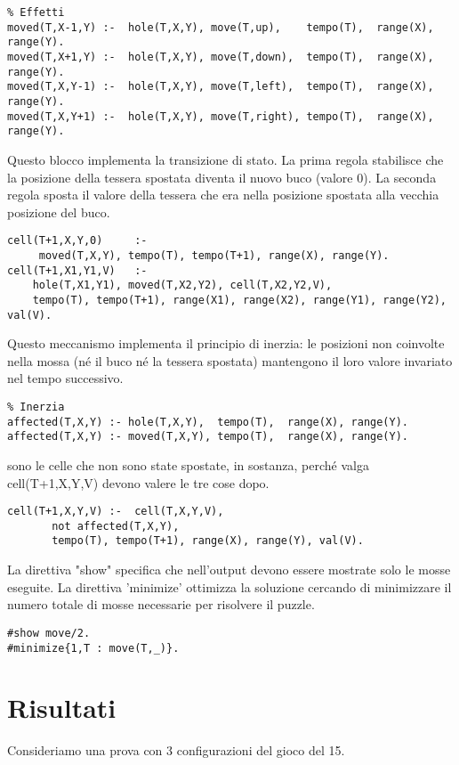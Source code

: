 \begin{verbatim}
% Effetti
moved(T,X-1,Y) :-  hole(T,X,Y), move(T,up),    tempo(T),  range(X), range(Y).
moved(T,X+1,Y) :-  hole(T,X,Y), move(T,down),  tempo(T),  range(X), range(Y).
moved(T,X,Y-1) :-  hole(T,X,Y), move(T,left),  tempo(T),  range(X), range(Y).
moved(T,X,Y+1) :-  hole(T,X,Y), move(T,right), tempo(T),  range(X), range(Y).
\end{verbatim}

Questo blocco implementa la transizione di stato. La prima regola stabilisce che la posizione della tessera spostata diventa il nuovo buco (valore 0). La seconda regola sposta il valore della tessera che era nella posizione spostata alla vecchia posizione del buco.

\begin{verbatim}
cell(T+1,X,Y,0)     :-  
     moved(T,X,Y), tempo(T), tempo(T+1), range(X), range(Y). 
cell(T+1,X1,Y1,V)   :-  
    hole(T,X1,Y1), moved(T,X2,Y2), cell(T,X2,Y2,V), 
    tempo(T), tempo(T+1), range(X1), range(X2), range(Y1), range(Y2), val(V).
\end{verbatim}

Questo meccanismo implementa il principio di inerzia: le posizioni non coinvolte nella mossa (né il buco né la tessera spostata) mantengono il loro valore invariato nel tempo successivo.

\begin{verbatim}
% Inerzia
affected(T,X,Y) :- hole(T,X,Y),  tempo(T),  range(X), range(Y).
affected(T,X,Y) :- moved(T,X,Y), tempo(T),  range(X), range(Y).
\end{verbatim}sono le celle che non sono state spostate, in sostanza, perché valga cell(T+1,X,Y,V) devono valere le tre cose dopo.

\begin{verbatim}
cell(T+1,X,Y,V) :-  cell(T,X,Y,V),
       not affected(T,X,Y), 
       tempo(T), tempo(T+1), range(X), range(Y), val(V).
\end{verbatim}

La direttiva "show" specifica che nell'output devono essere mostrate solo le mosse eseguite. La direttiva 'minimize' ottimizza la soluzione cercando di minimizzare il numero totale di mosse necessarie per risolvere il puzzle.

\begin{verbatim}
#show move/2.
#minimize{1,T : move(T,_)}.
\end{verbatim}

\section{Risultati}
Consideriamo una prova con 3 configurazioni del gioco del 15.

